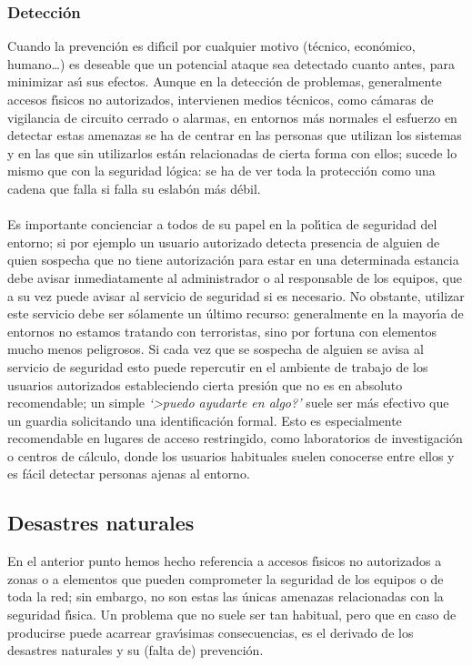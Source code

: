 \subsubsection{Detecci\'on}
Cuando la prevenci\'on es dif\'{\i}cil por cualquier motivo (t\'ecnico, 
econ\'omico, humano\ldots) es deseable que un potencial ataque sea detectado
cuanto antes, para minimizar as\'{\i} sus efectos. Aunque en la detecci\'on de
problemas, generalmente accesos f\'{\i}sicos no autorizados, intervienen medios
t\'ecnicos, como c\'amaras de vigilancia de circuito cerrado o alarmas, en 
entornos m\'as normales el esfuerzo en detectar estas amenazas se ha de centrar 
en las personas que
utilizan los sistemas y en las que sin utilizarlos est\'an relacionadas de 
cierta forma con ellos; sucede lo mismo que con la seguridad l\'ogica: se ha
de ver toda la protecci\'on como una cadena que falla si falla su eslab\'on
m\'as d\'ebil.\\
\\Es importante concienciar a todos de su papel en la pol\'{\i}tica de seguridad
del entorno; si por ejemplo un usuario autorizado detecta presencia de alguien 
de quien sospecha que no tiene autorizaci\'on para estar en una determinada
estancia debe avisar inmediatamente al administrador o al responsable de los
equipos, que a su vez puede avisar al servicio de seguridad si es necesario. No
obstante, utilizar este servicio debe ser s\'olamente un \'ultimo recurso: 
generalmente en la mayor\'{\i}a de entornos no estamos tratando con 
terroristas, sino por fortuna con elementos mucho menos peligrosos. Si 
cada vez que se sospecha de alguien se avisa al servicio de seguridad esto 
puede repercutir en el ambiente de trabajo de los usuarios autorizados 
estableciendo cierta presi\'on que no es en absoluto recomendable; un simple
{\it `>puedo ayudarte en algo?'} suele ser m\'as efectivo que un guardia 
solicitando una identificaci\'on formal. Esto es especialmente recomendable en
lugares de acceso restringido, como laboratorios de investigaci\'on o centros
de c\'alculo, donde los usuarios habituales suelen conocerse entre ellos y es
f\'acil detectar personas ajenas al entorno.
\subsection{Desastres naturales}
En el anterior punto hemos hecho referencia a accesos f\'{\i}sicos no 
autorizados a zonas o a elementos que pueden comprometer la seguridad de los
equipos o de toda la red; sin embargo, no son estas las \'unicas amenazas
relacionadas con la seguridad f\'{\i}sica. Un problema que no suele ser tan
habitual, pero que en caso de producirse puede acarrear grav\'{\i}simas
consecuencias, es el derivado de los desastres naturales y su (falta de) 
prevenci\'on.
